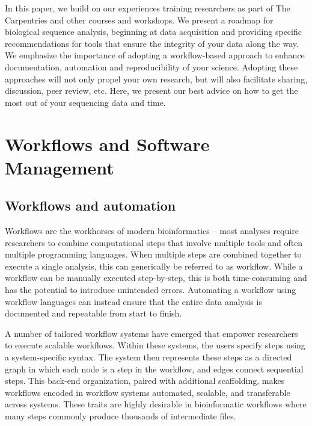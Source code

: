 \documentclass[10pt,letterpaper]{article}
\begin{document}
In this paper, we build on our experiences training researchers as part of The Carpentries and other courses and workshops. 
We present a roadmap for biological sequence analysis, beginning at data acquisition and providing specific recommendations for tools that ensure the integrity of your data along the way.
We emphasize the importance of adopting a workflow-based approach to enhance documentation, automation and reproducibility of your science.
Adopting these approaches will not only propel your own research, but will also facilitate sharing, discussion, peer review, etc. 
Here, we present our best advice on how to get the most out of your sequencing data and time.

%

\section*{Workflows and Software Management} %

\subsection*{Workflows and automation}
Workflows are the workhorses of modern bioinformatics -- most analyses require researchers to combine computational steps that involve multiple tools and often multiple programming languages.
When multiple steps are combined together to execute a single analysis, this can generically be referred to as workflow.
While a workflow can be manually executed step-by-step, this is both time-consuming and has the potential to introduce unintended errors. 
Automating a workflow using workflow languages can instead ensure that the entire data analysis is documented and repeatable from start to finish. 

A number of tailored workflow systems have emerged that empower researchers to execute scalable workflows. 
Within these systems, the users specify steps using a system-specific syntax. 
The system then represents these steps as a directed graph in which each node is a step in the workflow, and edges connect sequential steps. 
This back-end organization, paired with additional scaffolding, makes workflows encoded in workflow systems automated, scalable, and transferable across systems.
These traits are highly desirable in bioinformatic workflows where many steps commonly produce thousands of intermediate files.
\end{document}
